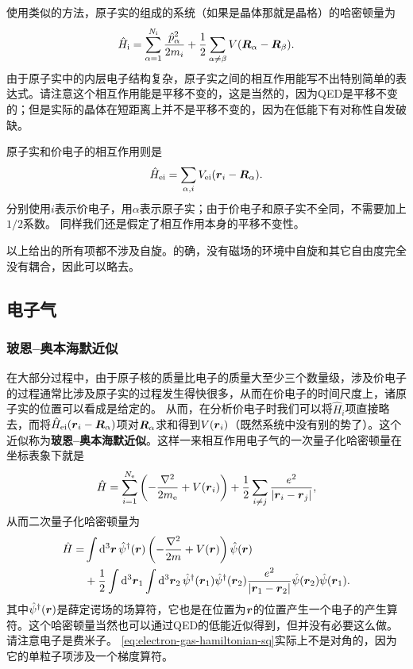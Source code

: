 \documentclass[hyperref, UTF8, a4paper]{ctexart}
\begin{document}
使用类似的方法，原子实的组成的系统（如果是晶体那就是晶格）的哈密顿量为
\begin{equation}
    \hat{H}_\text{i} = \sum_{\alpha=1}^{N_\text{i}} \frac{\hat{p}_\alpha^2}{2m_i} + \frac{1}{2} \sum_{\alpha\neq\beta} V(\vb*{R}_\alpha-\vb*{R}_\beta).
\end{equation}
由于原子实中的内层电子结构复杂，原子实之间的相互作用能写不出特别简单的表达式。请注意这个相互作用能是平移不变的，这是当然的，因为QED是平移不变的；但是实际的晶体在短距离上并不是平移不变的，因为在低能下有对称性自发破缺。

原子实和价电子的相互作用则是
\begin{equation}
    \hat{H}_\text{ei} = \sum_{\alpha, i} V_\text{ei}(\vb*{r}_i-\vb*{R}_\alpha). 
\end{equation}
分别使用$i$表示价电子，用$\alpha$表示原子实；由于价电子和原子实不全同，不需要加上$1/2$系数。
同样我们还是假定了相互作用本身的平移不变性。

以上给出的所有项都不涉及自旋。的确，没有磁场的环境中自旋和其它自由度完全没有耦合，因此可以略去。

\subsection{电子气}

\subsubsection{玻恩–奥本海默近似}

在大部分过程中，由于原子核的质量比电子的质量大至少三个数量级，涉及价电子的过程通常比涉及原子实的过程发生得快很多，从而在价电子的时间尺度上，诸原子实的位置可以看成是给定的。
从而，在分析价电子时我们可以将$\hat{H}_i$项直接略去，而将$\hat{H}_\text{ei}(\vb*{r}_i-\vb*{R}_\alpha)$项对$\vb*{R}_\alpha$求和得到$V(\vb*{r}_i)$（既然系统中没有别的势了）。这个近似称为\textbf{玻恩–奥本海默近似}。这样一来相互作用电子气的一次量子化哈密顿量在坐标表象下就是
\begin{equation}
    \hat{H} = \sum_{i=1}^{N_\text{e}} \left( - \frac{\laplacian}{2m_\text{e}} + V(\vb*{r}_i)\right) + \frac{1}{2} \sum_{i\neq j} \frac{e^2}{\abs{\vb*{r}_i - \vb*{r}_j}},
    \label{eq:electron-gas-hamiltonian}
\end{equation}
从而二次量子化哈密顿量为
\begin{equation}
    \begin{aligned}
        \hat{H} = &\int \dd[3]{\vb*{r}} \hat{\psi}^\dagger(\vb*{r}) \left( - \frac{\laplacian}{2m} + V(\vb*{r}) \right) \hat{\psi}(\vb*{r}) \\
        &+ \frac{1}{2} \int \dd[3]{\vb*{r}_1} \int \dd[3]{\vb*{r}_2} \hat{\psi}^\dagger (\vb*{r}_1) \hat{\psi}^\dagger (\vb*{r}_2) \frac{e^2}{\abs{\vb*{r}_1 - \vb*{r}_2}} \hat{\psi} (\vb*{r}_2) \hat{\psi}(\vb*{r}_1). 
        \label{eq:electron-gas-hamiltonian-sq}
    \end{aligned}
\end{equation}
其中$\hat{\psi}^\dagger(\vb*{r})$是薛定谔场的场算符，它也是在位置为$\vb*{r}$的位置产生一个电子的产生算符。这个哈密顿量当然也可以通过QED的低能近似得到，但并没有必要这么做。请注意电子是费米子。
\eqref{eq:electron-gas-hamiltonian-sq}实际上不是对角的，因为它的单粒子项涉及一个梯度算符。
\end{document}

